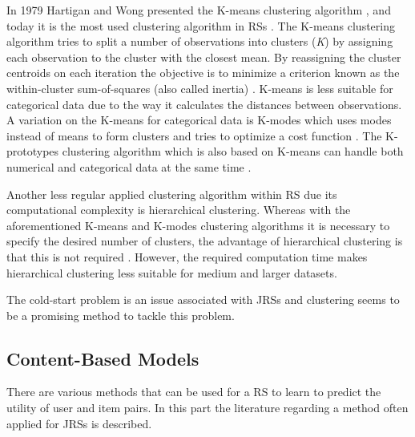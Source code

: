 In 1979 Hartigan and Wong presented the K-means clustering algorithm \cite{hartigan1979algorithm}, and today it is the most used clustering algorithm in RSs \cite{aggarwal2016recommender}.
The K-means clustering algorithm tries to split a number of observations into clusters (\textit{K}) by assigning each observation to the cluster with the closest mean.
By reassigning the cluster centroids on each iteration the objective is to minimize a criterion known as the within-cluster sum-of-squares (also called inertia) \cite{mackay2003example}. 
K-means is less suitable for categorical data due to the way it calculates the distances between observations.
A variation on the K-means for categorical data is K-modes which uses modes instead of means to form clusters and tries to optimize a cost function \cite{huang1997clustering, huang1998extensions}.
The K-prototypes clustering algorithm which is also based on K-means can handle both numerical and categorical data at the same time \cite{huang1997clustering}.

Another less regular applied clustering algorithm within RS due its computational complexity is hierarchical clustering.
Whereas with the aforementioned K-means and K-modes clustering algorithms it is necessary to specify the desired number of clusters, the advantage of hierarchical clustering is that this is not required \cite{rokach2005clustering}.
However, the required computation time makes hierarchical clustering less suitable for medium and larger datasets. 

The cold-start problem is an issue associated with JRSs and clustering seems to be a promising method to tackle this problem.

\subsection{Content-Based Models}
\label{sec:cbm}
There are various methods that can be used for a RS to learn to predict the utility of user and item pairs. 
In this part the literature regarding a method often applied for JRSs is described.

